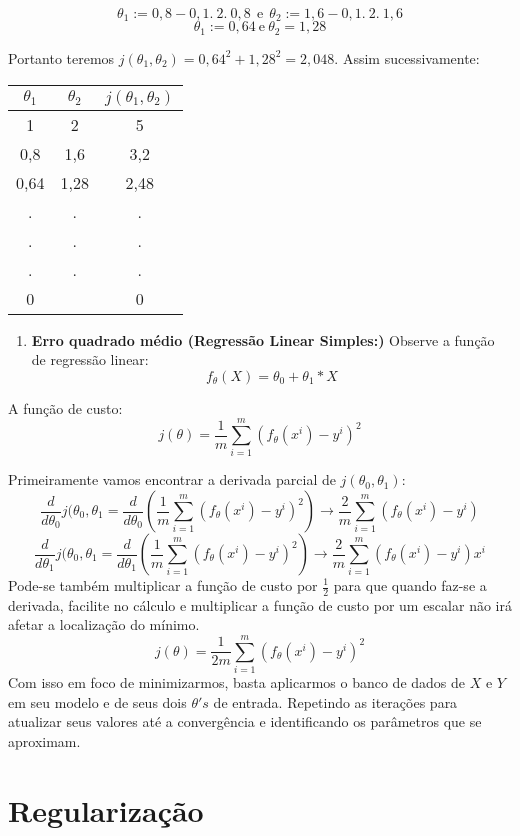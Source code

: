 \documentclass[
]{book}
\providecommand{\tightlist}{%
  \setlength{\itemsep}{0pt}\setlength{\parskip}{0pt}}
\begin{document}
\[\theta_1:=0,8-0,1.\ 2.\ 0,8 \ \ \mbox{e}\ \ \theta_2:=1,6-0,1.\ 2.\ 1,6\]
\[\theta_1:=0,64 \ \mbox{e} \ \theta_2=1,28\]

Portanto teremos \(j(\theta_1,\theta_2)=0,64^2+1,28^2=2,048\). Assim sucessivamente:

\begin{longtable}[]{@{}ccc@{}}
\toprule
\textbf{\(\theta_1\)} & \textbf{\(\theta_2\)} & \textbf{\(j(\theta_1,\theta_2)\)}\tabularnewline
\midrule
\endhead
1 & 2 & 5\tabularnewline
0,8 & 1,6 & 3,2\tabularnewline
0,64 & 1,28 & 2,48\tabularnewline
. & . & .\tabularnewline
. & . & .\tabularnewline
. & . & .\tabularnewline
0 & & 0\tabularnewline
\bottomrule
\end{longtable}

\begin{enumerate}
\def\labelenumi{\arabic{enumi}.}
\setcounter{enumi}{2}
\tightlist
\item
  \textbf{Erro quadrado médio (Regressão Linear Simples:)} Observe a função de regressão linear:
  \[f_\theta(X)=\theta_0+\theta_1*X\]
\end{enumerate}

A função de custo:
\[j(\theta)=\frac{1}{m}\displaystyle \sum^m_{i=1}(f_\theta(x^i)-y^i)^2\]

Primeiramente vamos encontrar a derivada parcial de \(j(\theta_0,\theta_1)\):
\[\frac{d}{d\theta_0}j(\theta_0,\theta_1=\frac{d}{d\theta_0}(\frac{1}{m}\displaystyle \sum^m_{i=1}(f_{\theta}(x^i)-y^i)^2) \rightarrow \frac{2}{m}\displaystyle \sum^m_{i=1}(f_\theta(x^i)-y^i) \]
\[\frac{d}{d\theta_1}j(\theta_0,\theta_1=\frac{d}{d\theta_1}(\frac{1}{m}\displaystyle \sum^m_{i=1}(f_{\theta}(x^i)-y^i)^2) \rightarrow \frac{2}{m}\displaystyle \sum^m_{i=1}(f_\theta(x^i)-y^i)x^i\]
Pode-se também multiplicar a função de custo por \(\frac{1}{2}\) para que quando faz-se a derivada, facilite no cálculo e multiplicar a função de custo por um escalar não irá afetar a localização do mínimo.
\[j(\theta)=\frac{1}{2m}\displaystyle \sum^m_{i=1}(f_\theta(x^i)-y^i)^2\]
Com isso em foco de minimizarmos, basta aplicarmos o banco de dados de \(X\) e \(Y\) em seu modelo e de seus dois \(\theta's\) de entrada. Repetindo as iterações para atualizar seus valores até a convergência e identificando os parâmetros que se aproximam.

\hypertarget{regularizacao}{%
\section{Regularização}\label{regularizacao}}
\end{document}
